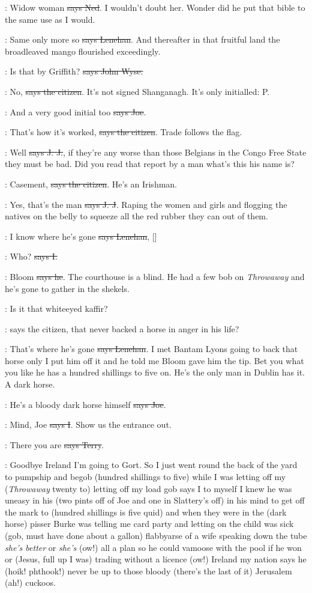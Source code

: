 \lambert:
Widow woman \sout{says Ned}.
I wouldn't doubt her. Wonder did he put that
bible to the same use as I would.

\lenehan:
Same only more so \sout{says Lenehan}.
And thereafter in that fruitful land
the broadleaved mango flourished exceedingly.

\johnwyse:
Is that by Griffith?
\sout{says John Wyse.}

\citizen:
No, \sout{says the citizen}.
It's not signed Shanganagh. It's only
initialled: P.

\joe:
And a very good initial too \sout{says Joe}.

\citizen:
That's how it's worked, \sout{says the citizen}.
Trade follows the flag.

\jjom:
Well \sout{says J. J.},
if they're any worse than those Belgians in the Congo
Free State they must be bad. Did you read that report by a man what's this
his name is?

\citizen:
Casement, \sout{says the citizen}.
He's an Irishman.

\jjom:
Yes, that's the man \sout{says J. J}.
Raping the women and girls and flogging
the natives on the belly to squeeze all the red rubber they can out of
them.

\lenehan:
I know where he's gone \sout{says Lenehan},
[]

:
Who? \sout{says I.}

\lenehan:
Bloom \sout{says he}.
The courthouse is a blind. He had a few bob on
\emph{Throwaway} and he's gone to gather in the shekels.

\citizen:
Is it that whiteeyed kaffir?

\Nq:
says the citizen, that never backed a horse
in anger in his life?

\lenehan:
That's where he's gone \sout{says Lenehan}.
I met Bantam Lyons going to back
that horse only I put him off it and he told me Bloom gave him the tip.
Bet you what you like he has a hundred shillings to five on. He's the only
man in Dublin has it. A dark horse.

\joe:
He's a bloody dark horse himself \sout{says Joe}.

:
Mind, Joe \sout{says I}. Show us the entrance out.

\terry:
There you are \sout{says Terry}.

\Nq:
Goodbye Ireland I'm going to Gort. So I just went round the back of
the yard to pumpship and begob (hundred shillings to five) while I was
letting off my (\emph{Throwaway} twenty to) letting off my load gob says I to
myself I knew he was uneasy in his (two pints off of Joe and one in
Slattery's off) in his mind to get off the mark to (hundred shillings is
five quid) and when they were in the (dark horse) pisser Burke
was telling me card party and letting on the child was sick (gob, must
have done about a gallon) flabbyarse of a wife speaking down the tube
\emph{she's better} or \emph{she's} (ow!) all a plan so he could vamoose with the
pool if he won or (Jesus, full up I was) trading without a licence (ow!)
Ireland my nation says he (hoik! phthook!) never be up to those
bloody (there's the last of it) Jerusalem (ah!) cuckoos.

